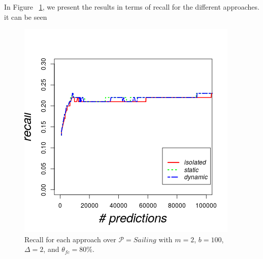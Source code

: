 \par In Figure ~\ref{fig:recall}, we present the results in terms of recall for the different approaches. it can be seen 

\begin{figure}[ht!]
	
	\includegraphics[width=.5\textwidth]{figures/recall.png}
	
	\caption{Recall for each approach over $\mathcal{P}=Sailing$ with $m=2$, $b=100$,  $\Delta=2$, and $\theta_{fc}=80\%$.}
	\label{fig:recall}
\end{figure}